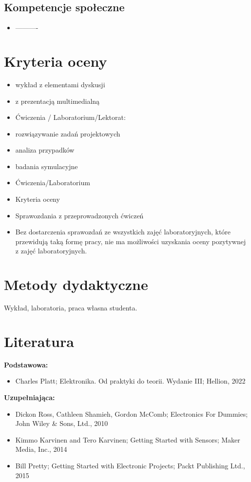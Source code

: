 \documentclass[12pt, a4paper]{article}
\begin{document}
\subsection*{Kompetencje społeczne}
\begin{itemize}
  \item ----------
\end{itemize}

\section{Kryteria oceny}

\begin{itemize}
  \item wykład z elementami dyskusji
  \item z prezentacją multimedialną
  \item Ćwiczenia / Laboratorium/Lektorat:
  \item rozwiązywanie zadań projektowych
  \item analiza przypadków
  \item badania symulacyjne
  \item Ćwiczenia/Laboratorium
  \item Kryteria oceny
  \item Sprawozdania z przeprowadzonych ćwiczeń
  \item Bez dostarczenia sprawozdań ze wszystkich zajęć laboratoryjnych, które przewidują taką formę pracy, nie ma możliwości uzyskania oceny pozytywnej z zajęć laboratoryjnych.
\end{itemize}

\section{Metody dydaktyczne}

Wykład, laboratoria, praca własna studenta.

\section{Literatura}

\textbf{Podstawowa:}
\begin{itemize}
  \item Charles Platt; Elektronika. Od praktyki do teorii. Wydanie III; Hellion, 2022
\end{itemize}

\textbf{Uzupełniająca:}
\begin{itemize}
  \item Dickon Ross, Cathleen Shamieh, Gordon McComb; Electronics For Dummies; John Wiley \& Sons, Ltd., 2010
  \item Kimmo Karvinen and Tero Karvinen; Getting Started with Sensors; Maker Media, Inc., 2014
  \item Bill Pretty; Getting Started with Electronic Projects; Packt Publishing Ltd., 2015
\end{itemize}
\end{document}

